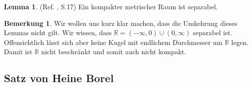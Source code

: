 \documentclass[10pt,a4paper]{article}
\theoremstyle{plain}
\theoremstyle{definition}
\newtheorem{lemma}[satz]{Lemma}
\newenvironment{lem}{\begin{shaded}\begin{lemma}}{\end{lemma}\end{shaded}}
\theoremstyle{nonumberplain}
\newtheorem{bemerkung}{Bemerkung}
\newenvironment{bem}{\begin{bemerkung}}{\end{bemerkung}}
\newcommand{\R}{\mathbb{R}}
\begin{document}
\begin{lem}
(Ref. \cite{Clason}, S.17) Ein kompakter metrischer Raum ist separabel.
\end{lem}
\begin{bem}
Wir wollen uns kurz klar machen, dass die Umkehrung dieses Lemmas nicht gilt. Wir wissen, dass $\R = (-\infty,0) \cup (0, \infty)$ separabel ist. Offensichtlich lässt sich aber keine Kugel mit endlichem Durchmesser um $\R$ legen. Damit ist $\R$ nicht beschränkt und somit auch nicht kompakt.
\end{bem}
\newpage

\subsection{Satz von Heine Borel}
\end{document}

